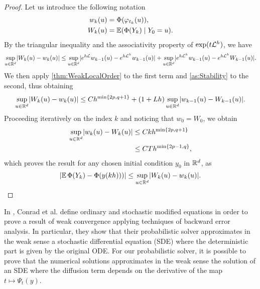\documentclass[final,onefignum,onetabnum]{siamonline171218}
\begin{document}
\begin{proof} Let us introduce the following notation
	\begin{equation}
		\begin{aligned}
			w_k(u) &= \Phi(\varphi_{t_k}(u)),\\
			W_k(u) &= \operatorname{\mathbb{E}}(\Phi(Y_k) \mid Y_0 = u).
		\end{aligned}
	\end{equation}
	By the triangular inequality and the associativity property of $\exp(t\mathcal{L}^h)$, we have
	\begin{equation}
		\begin{aligned}
			\sup_{u\in\mathbb{R}^d}\lvert W_k(u) - w_k(u)\rvert \leq \sup_{u\in\mathbb{R}^d}\lvert e^{h\mathcal{L}}w_{k-1}(u) - e^{h\mathcal{L}^h}w_{k-1}(u)\rvert + \sup_{u\in\mathbb{R}^d}\lvert e^{h\mathcal{L}^h}w_{k-1}(u) - e^{h\mathcal{L}^h}W_{k-1}(u)\rvert.
		\end{aligned}
	\end{equation}
	We then apply \cref{thm:WeakLocalOrder} to the first term and \cref{as:Stability} to the second, thus obtaining
	\begin{equation}
		\sup_{u\in\mathbb{R}^d}\lvert W_k(u) - w_k(u)\rvert \leq Ch^{\min\{2p, q + 1\}} + (1 + Lh)\sup_{u\in\mathbb{R}^d}\lvert w_{k-1}(u) - W_{k-1}(u)\rvert.
	\end{equation}
	Proceeding iteratively on the index $k$ and noticing that $w_0 = W_0$, we obtain
	\begin{equation}
		\begin{aligned}
			\sup_{u\in\mathbb{R}^d}\lvert w_k(u) - W_k(u)\rvert &\leq C k h^{\min\{2p, q + 1\}}\\
			&\leq C T h^{\min\{2p - 1, q\}},	
		\end{aligned}
	\end{equation}
	which proves the result for any chosen initial condition $y_0$ in $\mathbb{R}^d$, as
	\begin{equation}
		\lvert\operatorname{\mathbb{E}}\Phi(Y_k) - \Phi(y(kh)))\rvert \leq \sup_{u\in\mathbb{R}^d}\lvert W_k(u) - w_k(u)\rvert.
	\end{equation}
\end{proof}

\begin{remark} In \cite{CGS16}, Conrad et al. define ordinary and stochastic modified equations in order to prove a result of weak convergence applying techniques of backward error analysis. In particular, they show that their probabilistic solver approximates in the weak sense a stochastic differential equation (SDE) where the deterministic part is given by the original ODE. For our probabilistic solver, it is possible to prove that the numerical solutions approximates in the weak sense the solution of an SDE where the diffusion term depends on the derivative of the map $t \mapsto \Psi_t(y)$.
\end{remark}
\end{document}
